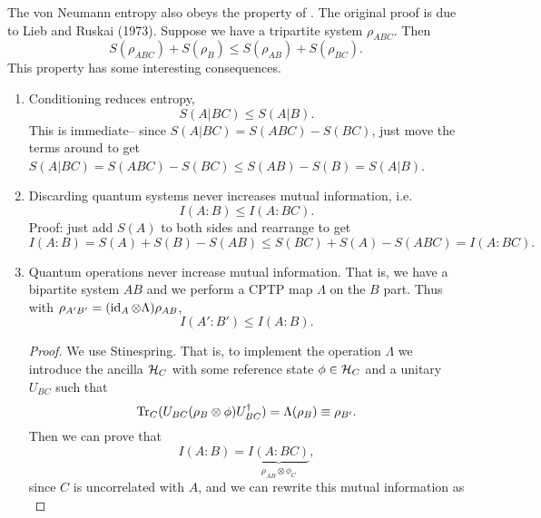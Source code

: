 The von Neumann entropy also obeys the property of . The original proof is due to Lieb and Ruskai (1973). Suppose we have a tripartite system $\rho_{ABC}$. Then 
\begin{equation}
    S(\rho_{ABC})+S(\rho_B) \leq S(\rho_{AB})+S(\rho_{BC}).
\end{equation}
This property has some interesting consequences.
\begin{enumerate}
    \item Conditioning reduces entropy,
    \begin{equation}
        S(A|BC) \leq S(A|B).
    \end{equation}
    This is immediate-- since $S(A|BC)=S(ABC)-S(BC)$, just move the terms around to get $S(A|BC)=S(ABC)-S(BC)\leq S(AB)-S(B) =S(A|B)$.
    \item Discarding quantum systems never increases mutual information, i.e.
    \begin{equation}
        I(A:B) \leq I(A:BC).
    \end{equation}
    Proof: just add $S(A)$ to both sides and rearrange to get
    \begin{equation}
        I(A:B)=S(A) +S(B) -S(AB) \leq S(BC) +S(A) -S(ABC) = I(A:BC).
    \end{equation}
    \item Quantum operations never increase mutual information. That is, we have a bipartite system $AB$ and we perform a CPTP map $\Lambda$ on the $B$ part. Thus with $\rho_{A'B'}=(\operatorname{id}_A \otimes \Lambda)\rho_{AB}$,
    \begin{equation}
        I(A':B') \leq I(A:B).
    \end{equation}
    \begin{proof}
        We use Stinespring. That is, to implement the operation $\Lambda$ we introduce the ancilla $\mathcal H_C$ with some reference state $\phi \in \mathcal H_C$ and a unitary $U_{BC}$ such that 
        \begin{equation}
            \operatorname{Tr}_C(U_{BC} (\rho_B \otimes \phi)U_{BC}^\dagger) =\Lambda(\rho_B) \equiv \rho_{B'}.
        \end{equation}
        Then we can prove that
        \begin{equation}
            I(A:B)=\underbrace{I(A:BC)}_{\rho_{AB} \otimes \phi_C},
        \end{equation}
        since $C$ is uncorrelated with $A$, and we can rewrite this mutual information as
        \begin{equation}

\end{equation}
\end{proof}
\end{enumerate}
